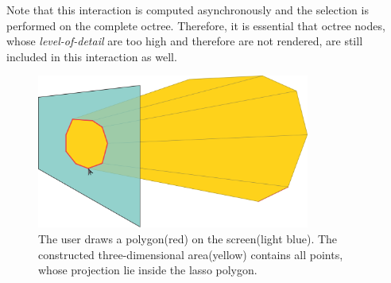 Note that this interaction is computed asynchronously and the selection is performed on the complete octree. Therefore, it is essential that octree nodes, whose \textit{level-of-detail} are too high and therefore are not rendered, are still included in this interaction as well. 


\begin{figure}
    \centering
    \includegraphics[width=0.8\textwidth]{System_Design/lasso_sketch.png}%
    \caption[Illustration of the creation of a lasso selection]
		{The user draws a polygon(red) on the screen(light blue). The constructed three-dimensional area(yellow) contains all points, whose projection lie inside the lasso polygon. }
    \label{fig:lasso_sketch}
\end{figure}


